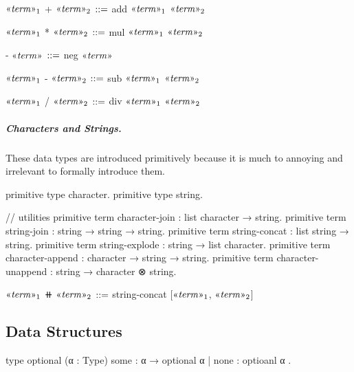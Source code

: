 \begin{notational}[caption={Notations for infixed binary numerical operations.}]
$\mvar{term}_1$ + $\mvar{term}_2$   $\syneq$   add $\mvar{term}_1$ $\mvar{term}_2$

$\mvar{term}_1$ * $\mvar{term}_2$   $\syneq$   mul $\mvar{term}_1$ $\mvar{term}_2$

- $\mvar{term}$   $\syneq$   neg $\mvar{term}$

$\mvar{term}_1$ - $\mvar{term}_2$   $\syneq$   sub $\mvar{term}_1$ $\mvar{term}_2$

$\mvar{term}_1$ / $\mvar{term}_2$   $\syneq$   div $\mvar{term}_1$ $\mvar{term}_2$
\end{notational}

\subparagraph{Characters and Strings.}
%
These data types are introduced primitively because it is much to annoying and irrelevant to formally introduce them.

\begin{program}[caption={string}]
primitive type character.
primitive type string.

// utilities
primitive term character-join     : list character → string.
primitive term string-join        : string → string → string.
primitive term string-concat      : list string → string.
primitive term string-explode     : string → list character.
primitive term character-append   : character → string → string.
primitive term character-unappend : string → character ⊗ string.
\end{program}

\begin{notational}[caption={Notations for characters and strings.}]
$\mvar{term}_1$ ⧺ $\mvar{term}_2$   $\syneq$   string-concat [$\mvar{term}_1$, $\mvar{term}_2$]
\end{notational}

\subsection{Data Structures}

\begin{program}[caption={optional}]
type optional (α : Type)
  { some : α → optional α
  | none : optioanl α }.
\end{program}


